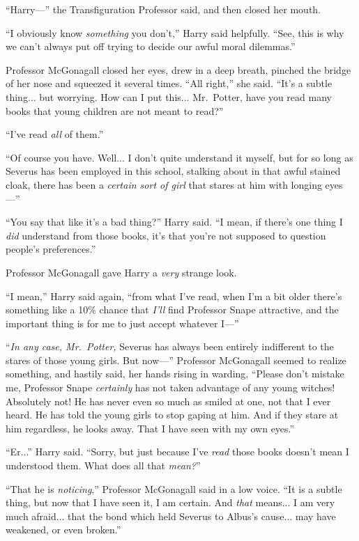 “Harry—” the Transfiguration Professor said, and then closed her mouth.

“I obviously know \emph{something} you don’t,” Harry said helpfully. “See, this is why we can’t always put off trying to decide our awful moral dilemmas.”

Professor McGonagall closed her eyes, drew in a deep breath, pinched the bridge of her nose and squeezed it several times. “All right,” she said. “It’s a subtle thing... but worrying. How can I put this... Mr.~Potter, have you read many books that young children are not meant to read?”

“I’ve read \emph{all} of them.”

“Of course you have. Well... I don’t quite understand it myself, but for so long as Severus has been employed in this school, stalking about in that awful stained cloak, there has been a \emph{certain sort of girl} that stares at him with longing eyes—”

“You say that like it’s a bad thing?” Harry said. “I mean, if there’s one thing I \emph{did} understand from those books, it’s that you’re not supposed to question people’s preferences.”

Professor McGonagall gave Harry a \emph{very} strange look.

“I mean,” Harry said again, “from what I’ve read, when I’m a bit older there’s something like a 10\% chance that \emph{I’ll} find Professor Snape attractive, and the important thing is for me to just accept whatever I—”

“\emph{In any case, Mr.~Potter,} Severus has always been entirely indifferent to the stares of those young girls. But now—” Professor McGonagall seemed to realize something, and hastily said, her hands rising in warding, “Please don’t mistake me, Professor Snape \emph{certainly} has not taken advantage of any young witches! Absolutely not! He has never even so much as smiled at one, not that I ever heard. He has told the young girls to stop gaping at him. And if they stare at him regardless, he looks away. That I have seen with my own eyes.”

“Er...” Harry said. “Sorry, but just because I’ve \emph{read} those books doesn’t mean I understood them. What does all that \emph{mean?}”

“That he is \emph{noticing},” Professor McGonagall said in a low voice. “It is a subtle thing, but now that I have seen it, I am certain. And \emph{that} means... I am very much afraid... that the bond which held Severus to Albus’s cause... may have weakened, or even broken.”

